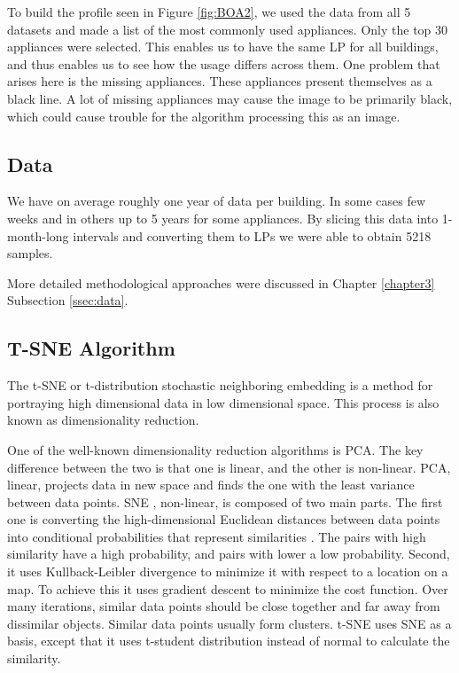 To build the profile seen in Figure \ref{fig:BOA2}, we used the data from all 5 datasets and made a list of the most commonly used appliances.
Only the top 30 appliances were selected.
This enables us to have the same LP for all buildings, and thus enables us to see how the usage differs across them.
One problem that arises here is the missing appliances.
These appliances present themselves as a black line.
A lot of missing appliances may cause the image to be primarily black,
which could cause trouble for the algorithm processing this as an image.

\subsection{Data}

We have on average roughly one year of data per building. 
In some cases few weeks and in others up to 5 years for some appliances.
By slicing this data into 1-month-long intervals and converting them to LPs we were able to obtain 5218 samples.

More detailed methodological approaches were discussed in Chapter \ref{chapter3} Subsection \ref{ssec:data}.

\subsection{T-SNE Algorithm}

The t-SNE \cite{tsne2} or t-distribution stochastic neighboring embedding is a method for portraying high dimensional 
data in low dimensional space. This process is also known as dimensionality reduction.

One of the well-known dimensionality reduction algorithms is PCA.
The key difference between the two is that one is linear, and the other is non-linear.
PCA, linear, projects data in new space and finds the one with the least variance between data points.
SNE \cite{sne1}, non-linear, is composed of two main parts. The first one is 
converting the high-dimensional Euclidean distances between data points into conditional probabilities that represent similarities \cite{sne1}.
The pairs with high similarity have a high probability, and pairs with lower a low probability.
Second, it uses Kullback-Leibler divergence to minimize it with respect to a location on a map.
To achieve this it uses gradient descent to minimize the cost function.
Over many iterations, similar data points should be close together and far away from dissimilar objects.
Similar data points usually form clusters. 
t-SNE uses SNE as a basis, except that it uses t-student distribution instead of normal to calculate the similarity.

